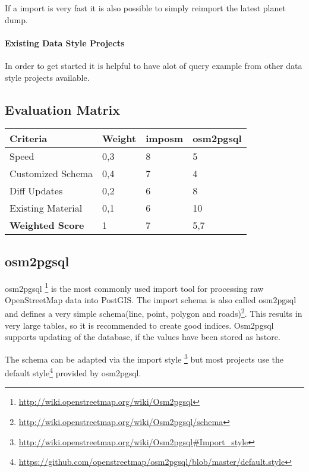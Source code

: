 If a import is very fast it is also possible to simply reimport the latest
planet dump.

\paragraph{Existing Data Style Projects}
In order to get started it is helpful to have alot of query example
from other data style projects available.

\subsection{Evaluation Matrix}\label{evaluation_matrix}

\begin{center}
    \begin{tabular}{llll}
    \hline
    Criteria         & Weight & imposm & osm2pgsql \\
    \hline
    Speed             & 0,3    & 8      & 5         \\
    Customized Schema & 0,4    & 7      & 4         \\
    Diff Updates      & 0,2    & 6      & 8         \\
    Existing Material & 0,1    & 6      & 10        \\
    \hline
    \textbf{Weighted Score} & 1      & 7      & 5,7       \\
    \end{tabular}
\end{center}


\subsection{osm2pgsql}\label{osm2pgsql_importer}

osm2pgsql \footnote{\url{http://wiki.openstreetmap.org/wiki/Osm2pgsql}} is the
most commonly used import tool for processing raw OpenStreetMap data into PostGIS.
The import schema is also called osm2pgsql and defines a very
simple schema(line, point, polygon and
roads)\footnote{\url{http://wiki.openstreetmap.org/wiki/Osm2pgsql/schema}}.
This results in very large tables, so it is recommended to create good
indices. Osm2pgsql supports updating of the database, if the values have
been stored as hstore.

The schema can be adapted via the import style \footnote{\url{http://wiki.openstreetmap.org/wiki/Osm2pgsql\#Import_style}}
but most projects use the default style\footnote{\url{https://github.com/openstreetmap/osm2pgsql/blob/master/default.style}} provided by osm2pgsql.

